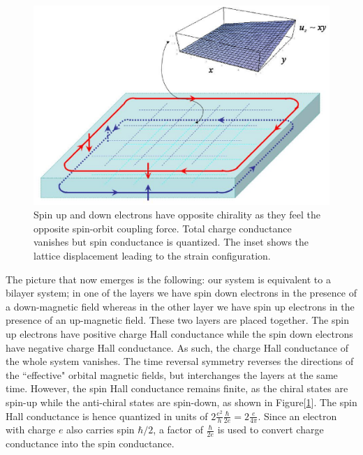 \documentclass[prl,aps,amssymb,shownopacs,twocolumn]{revtex4}
\begin{document}
\begin{figure}[h]
\includegraphics[scale=0.45]{edgecurrent.eps}
\caption{ Spin up and down electrons have opposite chirality as
they feel the opposite spin-orbit coupling force. Total charge
conductance vanishes but spin conductance is quantized. The inset
shows the lattice displacement leading to the strain
configuration.} \label{edgecurrent}
\end{figure}

The picture that now emerges is the following: our system is
equivalent to a bilayer system; in one of the layers we have spin
down electrons in the presence of a down-magnetic field whereas in
the other layer we have spin up electrons in the presence of an
up-magnetic field. These two layers are placed together. The spin up
electrons have positive charge Hall conductance while the spin down
electrons have negative charge Hall conductance. As such, the charge
Hall conductance of the whole system vanishes. The time reversal
symmetry reverses the directions of the ``effective" orbital
magnetic fields, but interchanges the layers at the same time.
However, the spin Hall conductance remains finite, as the chiral
states are spin-up while the anti-chiral states are spin-down, as
shown in Figure[\ref{edgecurrent}]. The spin Hall conductance is
hence quantized in units of $2 \frac{e^2}{h}
\frac{\hbar}{2e}=2\frac{e}{4\pi}$. Since an electron with charge $e$
also carries spin $\hbar/2$, a factor of $\frac{\hbar}{2e}$ is used
to convert charge conductance into the spin conductance.
\end{document}
